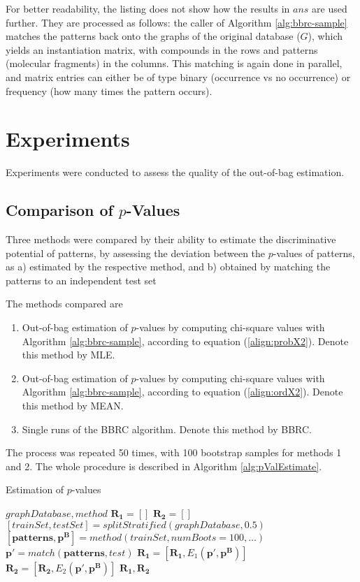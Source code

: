 \documentclass{article}
\begin{document}
For better readability, the listing does not show how the results in $ans$ are used further. They are processed as follows: the caller of Algorithm \ref{alg:bbrc-sample} matches the patterns back onto the graphs of the original database ($G$), which yields an instantiation matrix, with compounds in the rows and patterns (molecular fragments) in the columns. This matching is again done in parallel, and matrix entries can either be of type binary (occurrence vs no occurrence) or frequency (how many times the pattern occurs).

\section{Experiments}
Experiments were conducted to assess the quality of the out-of-bag estimation.

\subsection{Comparison of $p$-Values}
Three methods were compared by their ability to estimate the discriminative potential of patterns, by assessing the deviation between the $p$-values of patterns, as
a) estimated by the respective method, and 
b) obtained by matching the patterns to an independent test set

The methods compared are

\begin{enumerate}
  \item{Out-of-bag estimation of $p$-values by computing chi-square values with Algorithm \ref{alg:bbrc-sample}, according to equation (\ref{align:probX2}). Denote this method by MLE.}
  \item{Out-of-bag estimation of $p$-values by computing chi-square values with Algorithm \ref{alg:bbrc-sample}, according to equation (\ref{align:ordX2}). Denote this method by MEAN.}
  \item{Single runs of the BBRC algorithm. Denote this method by BBRC.} 
\end{enumerate}

The process was repeated 50 times, with 100 bootstrap samples for methods 1 and 2. The whole procedure is described in Algorithm \ref{alg:pValEstimate}.
\begin{algorithm}
  \caption{Estimation of $p$-values}
  \label{alg:pValEstimate}
\begin{algorithmic}[1]
  \Require $graphDatabase, method$ 
  \State $\mathbf{R_1}=\left[ \right]$
  \State $\mathbf{R_2}=\left[ \right]$
    \State $[trainSet, testSet] = splitStratified(graphDatabase,0.5)$ 
    \State $\left[ \mathbf{patterns}, \mathbf{p^B} \right] = method(trainSet,numBoots=100,\dots)$ 
    \State $\mathbf{p'} = match(\mathbf{patterns}, test)$ 
    \State $ \mathbf{R_1} = \left[ \mathbf{R_1}, E_1(\mathbf{p'}, \mathbf{p^B}) \right]$
    \State $ \mathbf{R_2} = \left[ \mathbf{R_2}, E_2(\mathbf{p'}, \mathbf{p^B}) \right]$
  \EndFor
  \Ensure $\mathbf{R_1},\mathbf{R_2}$
\end{algorithmic}
\end{algorithm}
\end{document}
